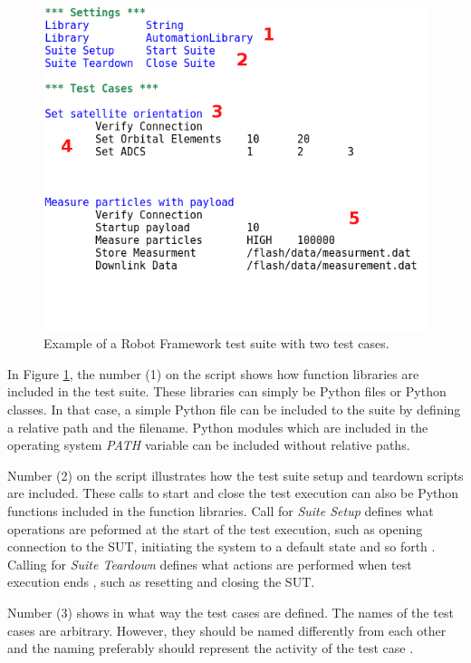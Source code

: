 \documentclass[english,12pt,a4paper,pdftex,elec,utf8]{aaltothesis}
\begin{document}
\begin{figure}[h!]
\centering
\includegraphics[scale=0.55]{robotexamplemod}
\caption{Example of a Robot Framework test suite with two test cases.}
\label{robotexample}
\end{figure}
In Figure \ref{robotexample}, the number (1) on the script shows how function libraries are included in the test suite. These libraries can simply be Python files or Python classes. In that case, a simple Python file can be included to the suite by defining a relative path and the filename. Python modules which are included in the operating system \textit{PATH} variable can be included without relative paths.\par 
Number (2) on the script illustrates how the test suite setup and teardown scripts are included. These calls to start and close the test execution can also be Python functions included in the function libraries. Call for \textit{Suite Setup} defines what operations are peformed at the start of the test execution, such as opening connection to the SUT, initiating  the system to a default state and so forth \cite{robotuserguide}. Calling for \textit{Suite Teardown} defines what actions are performed when test execution ends \cite{robotuserguide}, such as resetting and closing the SUT.\par 
Number (3) shows in what way the test cases are defined. The names of the test cases are arbitrary. However, they should be named differently from each other and the naming preferably should represent the activity of the test case \cite{robotuserguide}. \par 
\end{document}
